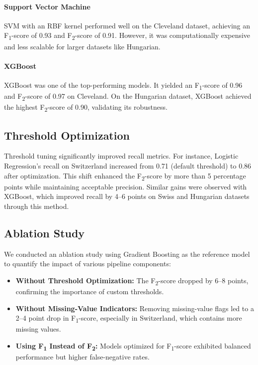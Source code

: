 \documentclass{article}
\begin{document}
\paragraph{Support Vector Machine}
SVM with an RBF kernel performed well on the Cleveland dataset, achieving an F\textsubscript{1}-score of 0.93 and F\textsubscript{2}-score of 0.91. However, it was computationally expensive and less scalable for larger datasets like Hungarian.

\paragraph{XGBoost}
XGBoost was one of the top-performing models. It yielded an F\textsubscript{1}-score of 0.96 and F\textsubscript{2}-score of 0.97 on Cleveland. On the Hungarian dataset, XGBoost achieved the highest F\textsubscript{2}-score of 0.90, validating its robustness.

\subsection{Threshold Optimization}

Threshold tuning significantly improved recall metrics. For instance, Logistic Regression's recall on Switzerland increased from 0.71 (default threshold) to 0.86 after optimization. This shift enhanced the F\textsubscript{2}-score by more than 5 percentage points while maintaining acceptable precision. Similar gains were observed with XGBoost, which improved recall by 4--6 points on Swiss and Hungarian datasets through this method.

\subsection{Ablation Study}

We conducted an ablation study using Gradient Boosting as the reference model to quantify the impact of various pipeline components:

\begin{itemize}
\item \textbf{Without Threshold Optimization:} The F\textsubscript{2}-score dropped by 6--8 points, confirming the importance of custom thresholds.
\item \textbf{Without Missing-Value Indicators:} Removing missing-value flags led to a 2--4 point drop in F\textsubscript{1}-score, especially in Switzerland, which contains more missing values.
\item \textbf{Using F\textsubscript{1} Instead of F\textsubscript{2}:} Models optimized for F\textsubscript{1}-score exhibited balanced performance but higher false-negative rates.
\end{itemize}
\end{document}
